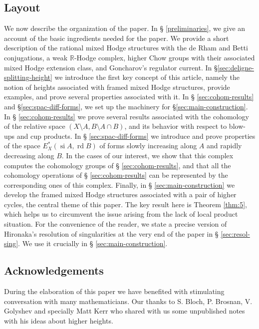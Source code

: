 \documentclass[11pt,a4paper]{amsart}
\newcommand{\R}{\mathds{R}}
\DeclareMathOperator{\si}{si}
\DeclareMathOperator{\rd}{rd}
\numberwithin{equation}{section}
\theoremstyle{plain}
\theoremstyle{definition}
\begin{document}
\subsection*{Layout}
We now describe the organization of the paper. In \S
\ref{preliminaries}, we give an account of the basic ingredients
needed for the paper. We provide a short description of the rational mixed
Hodge structures with the de Rham and Betti conjugations, a weak
$\R$-Hodge complex, higher Chow groups with their associated mixed
Hodge extension class, and Goncharov's regulator current. In \S \ref{sec:deligne-splitting-height} we
introduce the first key concept of this article, namely the notion of
heights associated with framed mixed Hodge structures, provide examples,
and prove several properties associated with it. In \S
\ref{sec:cohom-results} and \S \ref{sec:spac-diff-forms}, we set up the
machinery for \S \ref{sec:main-construction}. In \S
\ref{sec:cohom-results} we prove several results associated with the
cohomology of the relative space $(X\setminus A, B\setminus A\cap B)$,
and its behavior with respect to blow-ups and cup products. In \S
\ref{sec:spac-diff-forms} we introduce and prove properties of the
space $E^{\ast}_{X}(\si A, \rd B)$ of forms slowly increasing along
$A$ and rapidly decreasing along $B$. In the cases of our interest, we
show that this complex computes the cohomology groups of \S
\ref{sec:cohom-results}, and that all the cohomology operations of \S
\ref{sec:cohom-results} can be 
represented by the corresponding ones of this complex. Finally, in \S
\ref{sec:main-construction} we develop the framed mixed Hodge
structures associated with a pair of higher cycles, the central theme of
this paper. The key result here is Theorem \ref{thm:5}, which helps us
to circumvent the issue arising from the lack of local product
situation. For the convenience 
of the reader, we state a precise version of Hironaka's
resolution of singularities at the very end of the paper in \S
\ref{sec:resol-sing}. We use it crucially in \S
\ref{sec:main-construction}.

\subsection*{Acknowledgements}\label{subsec-Ac} During the elaboration
of this paper we have benefited with stimulating conversation with many
mathematicians. Our thanks to S. Bloch, P. Brosnan,  V. Golyshev and
specially Matt Kerr who shared with us some unpublished notes with his
ideas about higher heights.
\end{document}
